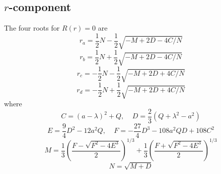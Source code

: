 \documentclass[12pt]{book}
\begin{document}
\subsection{$r$-component}
The four roots for $R(r)=0$ are
\begin{equation}
 r_a=\frac{1}{2}N -\frac{1}{2}\sqrt{-M+2D-4C/N}
\end{equation}
\begin{equation}
 r_b=\frac{1}{2}N +\frac{1}{2}\sqrt{-M+2D-4C/N}
\end{equation}
\begin{equation}
 r_c=-\frac{1}{2}N -\frac{1}{2}\sqrt{-M+2D+4C/N}
\end{equation}
\begin{equation}
 r_d=-\frac{1}{2}N +\frac{1}{2}\sqrt{-M+2D+4C/N}
\end{equation}
where
\begin{equation}
 C=(a-\lambda)^2+Q,~~~~~D=\frac{2}{3}(Q+\lambda^2-a^2)
\end{equation}
\begin{equation}
 E=\frac{9}{4}D^2-12a^2Q,~~~~~F=-\frac{27}{4}D^3-108a^2QD+108C^2
\end{equation}
\begin{equation}
 M=\frac{1}{3}\left(\frac{F-\sqrt{F^2-4E^3}}{2}\right)^{1/3}
+\frac{1}{3}\left(\frac{F+\sqrt{F^2-4E^3}}{2}\right)^{1/3}
\end{equation}
\begin{equation}
N=\sqrt{M+D}
\end{equation}
\end{document}

